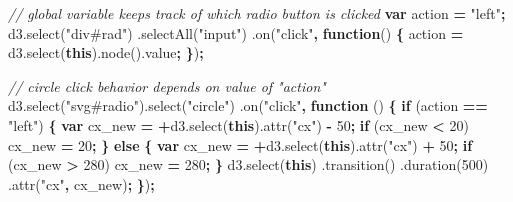 \documentclass[openany]{book}
\newenvironment{Shaded}{\begin{snugshade}}{\end{snugshade}}
\newcommand{\AttributeTok}[1]{\textcolor[rgb]{0.77,0.63,0.00}{#1}}
\newcommand{\CommentTok}[1]{\textcolor[rgb]{0.56,0.35,0.01}{\textit{#1}}}
\newcommand{\ControlFlowTok}[1]{\textcolor[rgb]{0.13,0.29,0.53}{\textbf{#1}}}
\newcommand{\DecValTok}[1]{\textcolor[rgb]{0.00,0.00,0.81}{#1}}
\newcommand{\KeywordTok}[1]{\textcolor[rgb]{0.13,0.29,0.53}{\textbf{#1}}}
\newcommand{\NormalTok}[1]{#1}
\newcommand{\OperatorTok}[1]{\textcolor[rgb]{0.81,0.36,0.00}{\textbf{#1}}}
\newcommand{\StringTok}[1]{\textcolor[rgb]{0.31,0.60,0.02}{#1}}
\newcommand{\VariableTok}[1]{\textcolor[rgb]{0.00,0.00,0.00}{#1}}
\begin{document}
\begin{Shaded}
\begin{Highlighting}[]
\CommentTok{// global variable keeps track of which radio button is clicked}
\KeywordTok{var}\NormalTok{ action }\OperatorTok{=} \StringTok{"left"}\OperatorTok{;}
\VariableTok{d3}\NormalTok{.}\AttributeTok{select}\NormalTok{(}\StringTok{"div#rad"}\NormalTok{)}
\NormalTok{  .}\AttributeTok{selectAll}\NormalTok{(}\StringTok{"input"}\NormalTok{)}
\NormalTok{  .}\AttributeTok{on}\NormalTok{(}\StringTok{"click"}\OperatorTok{,} \KeywordTok{function}\NormalTok{() }\OperatorTok{\{}\NormalTok{ action }\OperatorTok{=} \VariableTok{d3}\NormalTok{.}\AttributeTok{select}\NormalTok{(}\KeywordTok{this}\NormalTok{).}\AttributeTok{node}\NormalTok{().}\AttributeTok{value}\OperatorTok{;} \OperatorTok{\}}\NormalTok{)}\OperatorTok{;}
      
\CommentTok{// circle click behavior depends on value of "action"}
\VariableTok{d3}\NormalTok{.}\AttributeTok{select}\NormalTok{(}\StringTok{"svg#radio"}\NormalTok{).}\AttributeTok{select}\NormalTok{(}\StringTok{"circle"}\NormalTok{)}
\NormalTok{  .}\AttributeTok{on}\NormalTok{(}\StringTok{"click"}\OperatorTok{,} \KeywordTok{function}\NormalTok{ () }\OperatorTok{\{}
    \ControlFlowTok{if}\NormalTok{ (action }\OperatorTok{==} \StringTok{"left"}\NormalTok{) }\OperatorTok{\{}
      \KeywordTok{var}\NormalTok{ cx_new }\OperatorTok{=} \OperatorTok{+}\VariableTok{d3}\NormalTok{.}\AttributeTok{select}\NormalTok{(}\KeywordTok{this}\NormalTok{).}\AttributeTok{attr}\NormalTok{(}\StringTok{"cx"}\NormalTok{) }\OperatorTok{-} \DecValTok{50}\OperatorTok{;}
      \ControlFlowTok{if}\NormalTok{ (cx_new }\OperatorTok{<} \DecValTok{20}\NormalTok{) cx_new }\OperatorTok{=} \DecValTok{20}\OperatorTok{;}
      \OperatorTok{\}} \ControlFlowTok{else} \OperatorTok{\{}
      \KeywordTok{var}\NormalTok{ cx_new }\OperatorTok{=} \OperatorTok{+}\VariableTok{d3}\NormalTok{.}\AttributeTok{select}\NormalTok{(}\KeywordTok{this}\NormalTok{).}\AttributeTok{attr}\NormalTok{(}\StringTok{"cx"}\NormalTok{) }\OperatorTok{+} \DecValTok{50}\OperatorTok{;}
      \ControlFlowTok{if}\NormalTok{ (cx_new }\OperatorTok{>} \DecValTok{280}\NormalTok{) cx_new }\OperatorTok{=} \DecValTok{280}\OperatorTok{;}
      \OperatorTok{\}}
    \VariableTok{d3}\NormalTok{.}\AttributeTok{select}\NormalTok{(}\KeywordTok{this}\NormalTok{)}
\NormalTok{      .}\AttributeTok{transition}\NormalTok{()}
\NormalTok{      .}\AttributeTok{duration}\NormalTok{(}\DecValTok{500}\NormalTok{)}
\NormalTok{      .}\AttributeTok{attr}\NormalTok{(}\StringTok{"cx"}\OperatorTok{,}\NormalTok{ cx_new)}\OperatorTok{;}
      \OperatorTok{\}}\NormalTok{)}\OperatorTok{;}
\end{Highlighting}
\end{Shaded}
\end{document}
